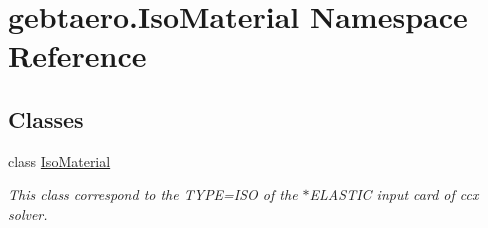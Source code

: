 \hypertarget{namespacegebtaero_1_1_iso_material}{}\section{gebtaero.\+Iso\+Material Namespace Reference}
\label{namespacegebtaero_1_1_iso_material}
\subsection*{Classes}
\begin{DoxyCompactItemize}
\item 
class \hyperlink{classgebtaero_1_1_iso_material_1_1_iso_material}{Iso\+Material}
\begin{DoxyCompactList}\small\item\em This class correspond to the T\+Y\+PE=I\+SO of the $\ast$\+E\+L\+A\+S\+T\+IC input card of ccx solver. \end{DoxyCompactList}\end{DoxyCompactItemize}
